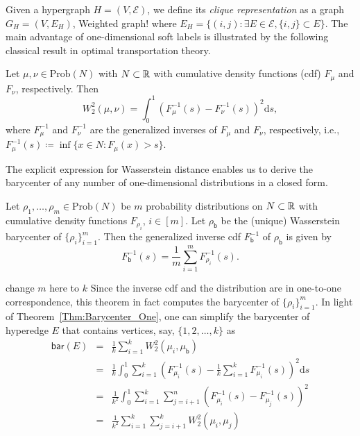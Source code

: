 \documentclass[letterpaper]{article} %
\begin{document}
Given a hypergraph $H=(V, \mathcal E)$, we define its \textit{clique representation} as a graph $G_H=(V, E_H)$, {\color{blue}Weighted graph!} where $E_H=\{(i, j):\exists E\in \mathcal E, \{i, j\}\subset E\}$. The main advantage of one-dimensional soft labels is illustrated by the following classical result in optimal transportation theory.
\begin{theorem}\label{Thm:Wasserstein_One}
Let $\mu, \nu\in \mathrm{Prob}(N)$ with $N\subset\mathbb{R}$ with cumulative density functions (cdf) $F_\mu$ and $F_\nu$, respectively. Then $$W_2^2(\mu, \nu)=\int_{0}^1\left(F_\mu^{-1}(s)-F_\nu^{-1}(s)\right)^2\text{d}s,$$
where $F_{\mu}^{-1}$ and $F_{\nu}^{-1}$ are the generalized inverses of $F_\mu$ and $F_\nu$, respectively, i.e., $F_\mu^{-1}(s)\coloneqq \inf\{x\in N:F_\mu(x)>s\}$. 
\end{theorem}
The explicit expression for Wasserstein distance enables us to derive the barycenter of any number of one-dimensional distributions in a closed form. 
\begin{theorem}
\label{Thm:Barycenter_One}
Let $\rho_1, \dots, \rho_m\in \mathrm{Prob}(N)$ be $m$ probability distributions on $N\subset\mathbb{R}$ with cumulative density functions $F_{\rho_i}$, $i\in [m]$. Let $\rho_{\mathsf{b}}$ be the (unique) Wasserstein barycenter of $\{\rho_i\}_{i=1}^m$. Then the generalized inverse cdf $F^{-1}_{\mathsf{b}}$ of $\rho_{\mathsf{b}}$ is given by 
$$F^{-1}_{\mathsf{b}}(s)=\frac{1}{m}\sum_{i=1}^mF_{\rho_i}^{-1}(s).$$
\end{theorem}
{\color{blue} change $m$ here to $k$}
Since the inverse cdf and the distribution are in one-to-one correspondence, this theorem in fact computes the barycenter of $\{\rho_i\}_{i=1}^m$. In light of Theorem~\ref{Thm:Barycenter_One}, one can simplify the barycenter of hyperedge $E$ that contains vertices, say, $\{1, 2, \dots, k\}$ as 
\begin{eqnarray}
\mathsf{bar}(E) &=& \frac{1}{k}\sum_{i=1}^kW^2_2(\mu_i, \mu_\mathsf{b})\nonumber\\
&=&\frac{1}{k}\int_{0}^{1}\sum_{i=1}^k\left(F_{\mu_i}^{-1}(s)-\frac{1}{k}\sum_{i=1}^kF_{\mu_i}^{-1}(s)\right)^2\text{d}s\nonumber\\
&=&\frac{1}{k^2}\int_0^1\sum_{i=1}^k\sum_{j=i+1}^n\left(F_{\mu_i}^{-1}(s)-F_{\mu_j}^{-1}(s)\right)^2 \nonumber\\
&=&\frac{1}{k^2}\sum_{i=1}^k\sum_{j=i+1}^kW_2^2(\mu_i, \mu_j)\label{Eq:One_D_Equivalence}
\end{eqnarray}
\end{document}
